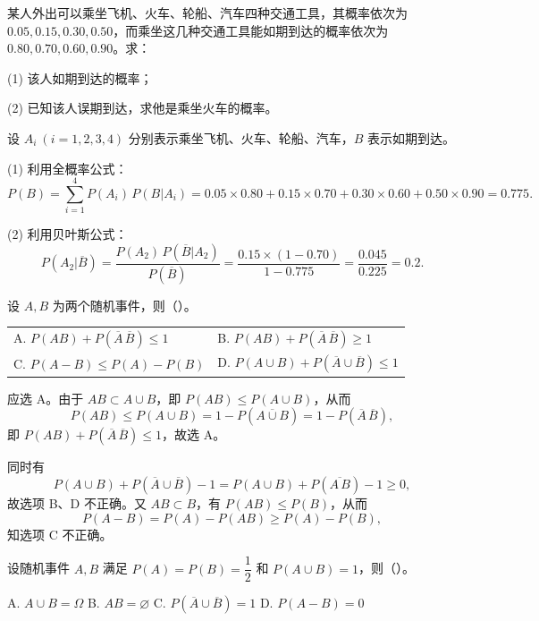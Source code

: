 ﻿\documentclass[lang=cn,11pt]{elegantbook}
\begin{document}
\begin{exercise}\label{exer:1-8}
某人外出可以乘坐飞机、火车、轮船、汽车四种交通工具，其概率依次为 \(0.05, 0.15, 0.30, 0.50\)，而乘坐这几种交通工具能如期到达的概率依次为 \(0.80, 0.70, 0.60, 0.90\)。求：
\par
(1) 该人如期到达的概率；\par
(2) 已知该人误期到达，求他是乘坐火车的概率。
\end{exercise}

\begin{solution}
设 \(A_i\ (i=1,2,3,4)\) 分别表示乘坐飞机、火车、轮船、汽车，\(B\) 表示如期到达。

(1) 利用全概率公式：
\[
P(B) = \sum_{i=1}^{4} P(A_i)\,P(B|A_i) = 0.05 \times 0.80 + 0.15 \times 0.70 + 0.30 \times 0.60 + 0.50 \times 0.90 = 0.775.
\]

(2) 利用贝叶斯公式：
\[
P(A_2|\overline{B}) = \frac{P(A_2)\,P(\overline{B}|A_2)}{P(\overline{B})} = \frac{0.15 \times (1-0.70)}{1-0.775} = \frac{0.045}{0.225} = 0.2.
\]
\end{solution}

\begin{exercise}\label{exer:1-9}
设 \(A, B\) 为两个随机事件，则（\quad）。\\
\begin{tabular}{ll}
A. \(P(AB)+P(\overline{A}\,\overline{B})\le 1\) & B. \(P(AB)+P(\overline{A}\,\overline{B})\ge 1\) \\[4pt]
C. \(P(A-B)\le P(A)-P(B)\) & D. \(P(A\cup B)+P(\overline{A}\cup\overline{B})\le 1\)
\end{tabular}
\end{exercise}

\begin{solution}
应选 A。由于 \(AB \subset A \cup B\)，即 \(P(AB) \le P(A \cup B)\)，从而
\[
P(AB) \le P(A \cup B) = 1 - P(\overline{A \cup B}) = 1 - P(\overline{A}\,\overline{B}),
\]
即 \(P(AB) + P(\overline{A}\,\overline{B}) \le 1\)，故选 A。

同时有
\[
P(A \cup B) + P(\overline{A} \cup \overline{B}) - 1 = P(A \cup B) + P(\overline{A\,B}) - 1 \ge 0,
\]
故选项 B、D 不正确。又 \(AB \subset B\)，有 \(P(AB) \le P(B)\)，从而
\[
P(A-B) = P(A) - P(AB) \ge P(A) - P(B),
\]
知选项 C 不正确。
\end{solution}

\begin{exercise}\label{exer:1-10}
设随机事件 \(A, B\) 满足 \(P(A)=P(B)=\dfrac{1}{2}\) 和 \(P(A \cup B)=1\)，则（）。\par
A. \(A \cup B = \Omega\)\quad
B. \(AB = \varnothing\)\quad
C. \(P(\overline{A} \cup \overline{B})=1\)\quad
D. \(P(A-B)=0\)
\end{exercise}
\end{document}
